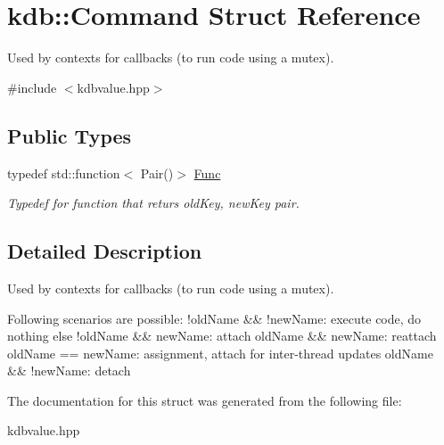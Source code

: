 \hypertarget{structkdb_1_1Command}{\section{kdb\-:\-:Command Struct Reference}
\label{structkdb_1_1Command}
}


Used by contexts for callbacks (to run code using a mutex).  




{\ttfamily \#include $<$kdbvalue.\-hpp$>$}

\subsection*{Public Types}
\begin{DoxyCompactItemize}
\item 
\hypertarget{structkdb_1_1Command_a93729918bbcc9dcc678ba303b396d86f}{typedef std\-::function$<$ Pair()$>$ \hyperlink{structkdb_1_1Command_a93729918bbcc9dcc678ba303b396d86f}{Func}}\label{structkdb_1_1Command_a93729918bbcc9dcc678ba303b396d86f}

\begin{DoxyCompactList}\small\item\em Typedef for function that returs old\-Key, new\-Key pair. \end{DoxyCompactList}\end{DoxyCompactItemize}


\subsection{Detailed Description}
Used by contexts for callbacks (to run code using a mutex). 

Following scenarios are possible\-: !old\-Name \&\& !new\-Name\-: execute code, do nothing else !old\-Name \&\& new\-Name\-: attach old\-Name \&\& new\-Name\-: reattach old\-Name == new\-Name\-: assignment, attach for inter-\/thread updates old\-Name \&\& !new\-Name\-: detach 

The documentation for this struct was generated from the following file\-:\begin{DoxyCompactItemize}
\item 
kdbvalue.\-hpp\end{DoxyCompactItemize}
